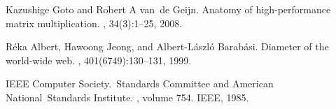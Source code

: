\documentclass[review]{cvpr}
\begin{document}
{\begin{thebibliography}{10}
Kazushige Goto and Robert A van~de Geijn.
\newblock Anatomy of high-performance matrix multiplication.
, 34(3):1--25,
  2008.


R{\'e}ka Albert, Hawoong Jeong, and Albert-L{\'a}szl{\'o} Barab{\'a}si.
\newblock Diameter of the world-wide web.
, 401(6749):130--131, 1999.

IEEE Computer Society.~Standards Committee and American National~Standards
  Institute.
, volume 754.
\newblock IEEE, 1985.

\end{thebibliography}

}
\end{document}

